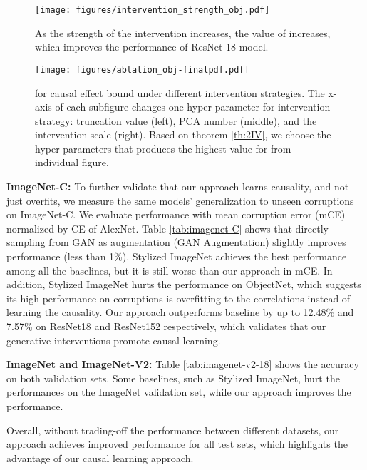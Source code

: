 \documentclass[final]{cvpr}
\begin{document}
\begin{figure}[t]
    \centering
    \texttt{[image: figures/intervention\_strength\_obj.pdf]}
    \caption{As the strength of the intervention increases, the value of  increases, which improves the performance of ResNet-18 model. }
    \label{fig:intervention}
    \vspace{-4mm}
\end{figure}


\begin{figure}[t]
    \centering
    \texttt{[image: figures/ablation\_obj-finalpdf.pdf]}
    \caption{ for causal effect bound under different intervention strategies. The x-axis of each subfigure changes one hyper-parameter for intervention strategy: truncation value  (left), PCA number  (middle), and the intervention scale  (right). Based on theorem \ref{th:2IV}, we choose the hyper-parameters  that produces the highest value for  from individual figure.}
    \label{fig:intervention_ablation}
    \vspace{-4mm}
\end{figure}

\textbf{ImageNet-C:} To further validate that our approach learns causality, and not just overfits, we measure the same models' generalization to unseen corruptions on ImageNet-C. We evaluate performance with mean corruption error (mCE) \cite{imgnet-C} normalized by CE of AlexNet. Table \ref{tab:imagenet-C} shows that directly sampling from GAN as augmentation (GAN Augmentation) slightly improves performance (less than 1\%). Stylized ImageNet achieves the best performance among all the baselines, but it is still worse than our approach in mCE. In addition, Stylized ImageNet hurts the performance on ObjectNet, which suggests its high performance on corruptions is overfitting to the correlations instead of learning the causality. Our approach outperforms baseline by up to 12.48\% and 7.57\% on ResNet18 and ResNet152 respectively, which validates that our generative interventions promote causal learning.



\textbf{ImageNet and ImageNet-V2:} Table \ref{tab:imagenet-v2-18} shows the accuracy on both validation sets. Some baselines, such as Stylized ImageNet, hurt the performances on the ImageNet validation set, while our approach improves the performance.  

Overall, without trading-off the performance between different datasets, our approach achieves improved performance for all test sets, which highlights the advantage of our causal learning approach.
\end{document}
